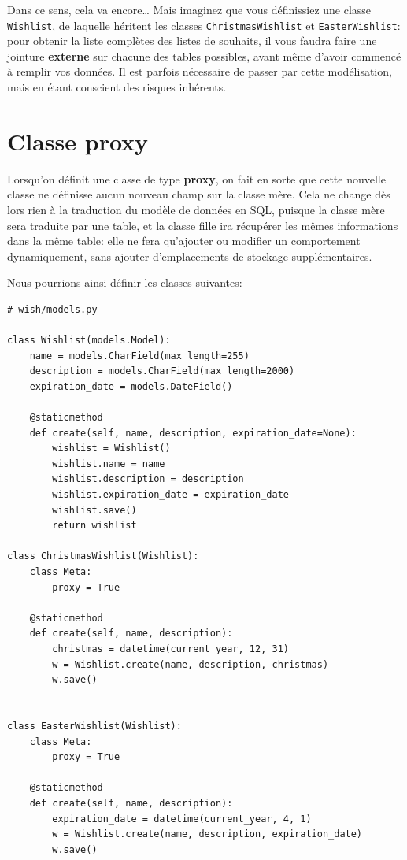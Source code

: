 \documentclass[11pt]{amsbook}
\begin{document}
Dans ce sens, cela va encore…​ Mais imaginez que vous définissiez une classe \texttt{Wishlist}, de laquelle héritent les classes \texttt{ChristmasWishlist} et \texttt{EasterWishlist}: pour obtenir la liste complètes des listes de souhaits, il vous faudra faire une jointure \textbf{externe} sur chacune des tables possibles, avant même d’avoir commencé à remplir vos données. Il est parfois nécessaire de passer par cette modélisation, mais en étant conscient des risques inhérents.


\hypertarget{x-classe-proxy}{\section{Classe proxy}}
Lorsqu’on définit une classe de type \textbf{proxy}, on fait en sorte que cette nouvelle classe ne définisse aucun nouveau champ sur la classe mère. Cela ne change dès lors rien à la traduction du modèle de données en SQL, puisque la classe mère sera traduite par une table, et la classe fille ira récupérer les mêmes informations dans la même table: elle ne fera qu’ajouter ou modifier un comportement dynamiquement, sans ajouter d’emplacements de stockage supplémentaires.


Nous pourrions ainsi définir les classes suivantes:


\begin{verbatim}
# wish/models.py

class Wishlist(models.Model):
    name = models.CharField(max_length=255)
    description = models.CharField(max_length=2000)
    expiration_date = models.DateField()

    @staticmethod
    def create(self, name, description, expiration_date=None):
        wishlist = Wishlist()
        wishlist.name = name
        wishlist.description = description
        wishlist.expiration_date = expiration_date
        wishlist.save()
        return wishlist

class ChristmasWishlist(Wishlist):
    class Meta:
        proxy = True

    @staticmethod
    def create(self, name, description):
        christmas = datetime(current_year, 12, 31)
        w = Wishlist.create(name, description, christmas)
        w.save()


class EasterWishlist(Wishlist):
    class Meta:
        proxy = True

    @staticmethod
    def create(self, name, description):
        expiration_date = datetime(current_year, 4, 1)
        w = Wishlist.create(name, description, expiration_date)
        w.save()
\end{verbatim}
\end{document}
